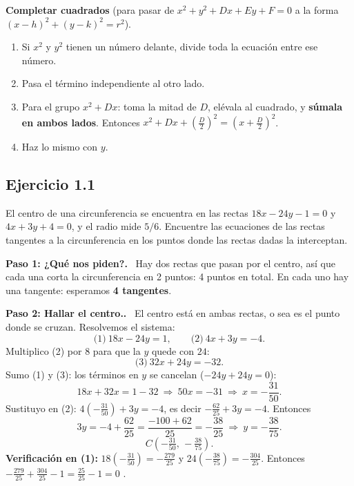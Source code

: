 \documentclass[11pt,a4paper]{article}
\newcommand{\paso}[1]{\par\medskip\noindent\textbf{\textcolor{blue!50!black}{Paso #1.}}\ }
\begin{document}
\begin{idea}
\textbf{Completar cuadrados} (para pasar de $x^2+y^2+Dx+Ey+F=0$ a la forma $(x-h)^2+(y-k)^2=r^2$).
\begin{enumerate}[nosep]
  \item Si $x^2$ y $y^2$ tienen un número delante, divide toda la ecuación entre ese número.
  \item Pasa el término independiente al otro lado.
  \item Para el grupo $x^2+Dx$: toma la mitad de $D$, elévala al cuadrado, y \textbf{súmala en ambos lados}. Entonces $x^2+Dx+\left(\frac D2\right)^2=\left(x+\frac D2\right)^2$.
  \item Haz lo mismo con $y$.
\end{enumerate}
\end{idea}

\subsection{Ejercicio 1.1}
\begin{enunciado}
El centro de una circunferencia se encuentra en las rectas $18x-24y-1=0$ y $4x+3y+4=0$, y el radio mide $5/6$.
Encuentre las ecuaciones de las rectas tangentes a la circunferencia en los puntos donde las rectas dadas la interceptan.
\end{enunciado}

\paso{1: ¿Qué nos piden?} Hay dos rectas que pasan por el centro, así que cada una corta la circunferencia en 2 puntos: 4 puntos en total.
En cada uno hay una tangente: esperamos \textbf{4 tangentes}.

\paso{2: Hallar el centro.} El centro está en ambas rectas, o sea es el punto donde se cruzan. Resolvemos el sistema:
\[
\text{(1)}\ 18x-24y=1,\qquad \text{(2)}\ 4x+3y=-4.
\]
Multiplico (2) por $8$ para que la $y$ quede con $24$:
\[ \text{(3)}\ 32x+24y=-32. \]
Sumo (1) y (3): los términos en $y$ se cancelan ($-24y+24y=0$):
\[ 18x+32x=1-32\ \Rightarrow\ 50x=-31\ \Rightarrow\ x=-\frac{31}{50}. \]
Sustituyo en (2): $4\left(-\frac{31}{50}\right)+3y=-4$, es decir $-\frac{62}{25}+3y=-4$. Entonces
\[ 3y=-4+\frac{62}{25}=\frac{-100+62}{25}=-\frac{38}{25}\ \Rightarrow\ y=-\frac{38}{75}. \]
\[ C\left(-\tfrac{31}{50},\,-\tfrac{38}{75}\right). \]
\textbf{Verificación en (1):} $18\left(-\frac{31}{50}\right)=-\frac{279}{25}$ y $24\left(-\frac{38}{75}\right)=-\frac{304}{25}$.
Entonces $-\frac{279}{25}+\frac{304}{25}-1=\frac{25}{25}-1=0$ \checkmark.
\end{document}
